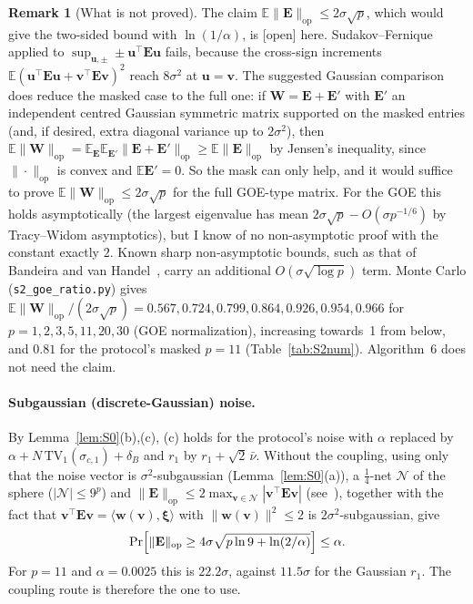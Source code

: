 \documentclass[11pt]{article}
\theoremstyle{definition}
\newtheorem{remark}[definition]{Remark}
\theoremstyle{plain}
\newcommand{\Ex}{\mathbb{E}}
\newcommand{\bE}{\mathbf{E}}
\newcommand{\bu}{\mathbf{u}}
\newcommand{\bv}{\mathbf{v}}
\newcommand{\bxi}{\boldsymbol{\xi}}
\newcommand{\bw}{\mathbf{w}}
\newcommand{\op}{\mathrm{op}}
\newcommand{\status}[1]{\textsf{\small[#1]}}
\begin{document}
\begin{remark}[What is not proved]\label{rem:S2open}
The claim $\Ex\|\bE\|_\op\le2\sigma\sqrt p$, which would give the two-sided bound with $\ln(1/\alpha)$, is \status{open} here. Sudakov--Fernique applied to $\sup_{\bu,\pm}\pm\bu^\top\bE\bu$ fails, because the cross-sign increments $\Ex(\bu^\top\bE\bu+\bv^\top\bE\bv)^2$ reach $8\sigma^2$ at $\bu=\bv$. The suggested Gaussian comparison does reduce the masked case to the full one: if $\mathbf W=\bE+\bE'$ with $\bE'$ an independent centred Gaussian symmetric matrix supported on the masked entries (and, if desired, extra diagonal variance up to $2\sigma^2$), then $\Ex\|\mathbf W\|_\op=\Ex_{\bE}\Ex_{\bE'}\|\bE+\bE'\|_\op\ge\Ex\|\bE\|_\op$ by Jensen's inequality, since $\|\cdot\|_\op$ is convex and $\Ex\bE'=0$. So the mask can only help, and it would suffice to prove $\Ex\|\mathbf W\|_\op\le2\sigma\sqrt p$ for the full GOE-type matrix. For the GOE this holds asymptotically (the largest eigenvalue has mean $2\sigma\sqrt p-O(\sigma p^{-1/6})$ by Tracy--Widom asymptotics), but I know of no non-asymptotic proof with the constant exactly $2$. Known sharp non-asymptotic bounds, such as that of Bandeira and van Handel~\cite{BvH16}, carry an additional $O(\sigma\sqrt{\log p})$ term. Monte Carlo (\texttt{s2\_goe\_ratio.py}) gives $\Ex\|\mathbf W\|_\op/(2\sigma\sqrt p)=0.567,0.724,0.799,0.864,0.926,0.954,0.966$ for $p=1,2,3,5,11,20,30$ (GOE normalization), increasing towards~1 from below, and $0.81$ for the protocol's masked $p=11$ (Table~\ref{tab:S2num}). Algorithm~6 does not need the claim.
\end{remark}

\paragraph{Subgaussian (discrete-Gaussian) noise.} By Lemma~\ref{lem:S0}(b),(c), (c) holds for the protocol's noise with $\alpha$ replaced by $\alpha+N\,\mathrm{TV}_1(\sigma_{c,1})+\delta_B$ and $r_1$ by $r_1+\sqrt2\,\bar\nu$. Without the coupling, using only that the noise vector is $\sigma^2$-subgaussian (Lemma~\ref{lem:S0}(a)), a $\tfrac14$-net $\mathcal N$ of the sphere ($|\mathcal N|\le9^p$) and $\|\bE\|_\op\le2\max_{\bv\in\mathcal N}|\bv^\top\bE\bv|$ (see~\cite[Cor.~4.2.13, Ex.~4.4.3]{Vershynin18}), together with the fact that $\bv^\top\bE\bv=\langle\bw(\bv),\bxi\rangle$ with $\|\bw(\bv)\|^2\le2$ is $2\sigma^2$-subgaussian, give
\[
  \Pr\Bigl[\|\bE\|_\op\ge4\sigma\sqrt{p\ln9+\ln(2/\alpha)}\Bigr]\le\alpha .
\]
For $p=11$ and $\alpha=0.0025$ this is $22.2\sigma$, against $11.5\sigma$ for the Gaussian $r_1$. The coupling route is therefore the one to use.
\end{document}
